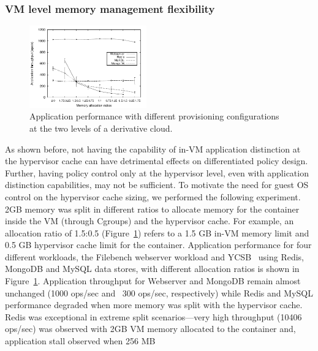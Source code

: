 \subsubsection{VM level memory management flexibility}
\label{subsec:sdc}
%
%
\begin{figure}[t]
  \centering
\includegraphics[width=0.45\textwidth]{images/appl_behavior} 
 \caption{Application performance with different provisioning configurations 
  at the two levels of a derivative cloud.}
 \label{fig:app_behavior} 
\end{figure}
%
%
As shown before, not having the capability of in-VM
application distinction at the hypervisor cache
can have detrimental effects on differentiated policy design.
%
Further, having policy control only at the hypervisor level,
even with application distinction capabilities,
may not be sufficient.
To motivate the need for 
guest OS control on the hypervisor cache sizing, we performed the 
following experiment.
%
2GB memory was split in different ratios to allocate memory for the container 
inside the VM (through Cgroups) and the hypervisor cache.
%
For example, an allocation ratio of 1.5:0.5 (Figure~\ref{fig:app_behavior}) refers to
a 1.5 GB in-VM memory limit and 0.5 GB hypervisor cache limit for
the container. 
%
Application performance for four different workloads,
the Filebench webserver workload and YCSB~\cite{ycsb} using 
Redis, MongoDB and MySQL data stores,
with different allocation ratios is shown in 
Figure~\ref{fig:app_behavior}. 
%
Application throughput for Webserver and MongoDB remain almost unchanged 
(1000 ops/sec and ~300 ops/sec, respectively) while Redis and MySQL performance 
degraded when more memory was split with the hypervisor cache.
%
Redis was exceptional in extreme split scenarios---very high throughput (10406 ops/sec) was
observed with 2GB VM memory allocated to the container and, application stall observed when 256 MB 
